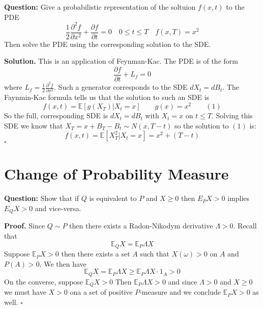 \documentclass{article}
\begin{document}
\begin{tcolorbox}[colframe=black,colback=gray!5,boxrule=0.5pt]
\textbf{Question:} Give a probabilistic representation of the soltuion $f(x,t)$ to the PDE
$$\frac{1}{2}\frac{\partial^2 f}{\partial x^2} + \frac{\partial f}{\partial t} =0 \quad 0\leq t\leq T\quad f(x,T)=x^2$$
Then solve the PDE using the corresponding solution to the SDE.
\end{tcolorbox}
\textbf{Solution.} This is an application of Feynman-Kac. The PDE is of the form 
$$\frac{\partial f }{\partial t} + L_f=0$$
where $L_f = \frac{1}{2}\frac{\partial^2 f}{\partial x^2}$. Such a generator corresponds to the SDE $dX_t = dB_t$. The Faynmin-Kac formula tells us that the solution to such an SDE is 
$$f(x,t) = \mathbb{E}[g(X_T) | X_t=x] \quad\quad g(x)=x^2\quad\quad(1)$$
So the full, corresponding SDE is $dX_t = dB_t$ with $X_t=x$ on $t\leq T$. Solving this SDE we know that $X_T = x + B_T-B_t\sim N(x,T-t)$ so the solution to $(1)$ is:
$$f(x,t) = \mathbb{E}[X_T^2 | X_t=x] = x^2 + (T-t)$$
$\square$

\newpage
\section{Change of Probability Measure}

\begin{tcolorbox}[colframe=black,colback=gray!5,boxrule=0.5pt]
\textbf{Question:} Show that if $Q$ is equivalent to $P$ and $X\geq0$ then $E_PX > 0 $ implies $E_QX>0$ and vice-versa. 
\end{tcolorbox}
\textbf{Proof.} Since $Q\sim P$ then there exists a Radon-Nikodym derivative $\Lambda>0$. Recall that 
$$\mathbb{E}_QX = \mathbb{E}_P\Lambda X$$
Suppose $\mathbb{E}_PX >0$ then there exists a set $A$ such that $X(\omega)>0$ on $A$ and $P(A)>0$. We then have
$$\mathbb{E}_QX = \mathbb{E}_P\Lambda X \geq \mathbb{E}_P\Lambda X\cdot1_A>0$$
On the converse, suppose $\mathbb{E}_Q X> 0$ Then $\mathbb{E}_P\Lambda X>0$ and since $\Lambda > 0$ and $X\geq 0$ we must have $X>0$ ona a set of positive $P$-measure and we conclude $\mathbb{E}_PX>0$ as well. $\square$
\end{document}
